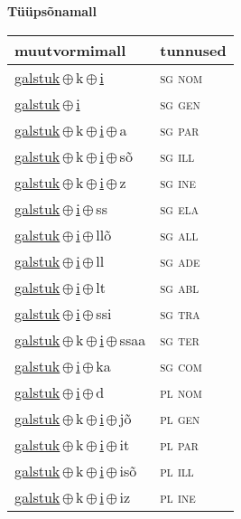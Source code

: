 

\vspace{3.5em}
\noindent \begin{minipage}{\textwidth}
\noindent \textbf{Tüüpsõnamall \,}\\

\begin{sideways}
\begin{tabular}{l l}
muutvormimall & tunnused \\
\hline
\underline{galstuk}\,$\oplus$\,k\,$\oplus$\,\underline{i} & \textsc{ sg nom } \\
\underline{galstuk}\,$\oplus$\,\underline{i} & \textsc{ sg gen } \\
\underline{galstuk}\,$\oplus$\,k\,$\oplus$\,\underline{i}\,$\oplus$\,a & \textsc{ sg par } \\
\underline{galstuk}\,$\oplus$\,k\,$\oplus$\,\underline{i}\,$\oplus$\,sõ & \textsc{ sg ill } \\
\underline{galstuk}\,$\oplus$\,k\,$\oplus$\,\underline{i}\,$\oplus$\,z & \textsc{ sg ine } \\
\underline{galstuk}\,$\oplus$\,\underline{i}\,$\oplus$\,ss & \textsc{ sg ela } \\
\underline{galstuk}\,$\oplus$\,\underline{i}\,$\oplus$\,llõ & \textsc{ sg all } \\
\underline{galstuk}\,$\oplus$\,\underline{i}\,$\oplus$\,ll & \textsc{ sg ade } \\
\underline{galstuk}\,$\oplus$\,\underline{i}\,$\oplus$\,lt & \textsc{ sg abl } \\
\underline{galstuk}\,$\oplus$\,\underline{i}\,$\oplus$\,ssi & \textsc{ sg tra } \\
\underline{galstuk}\,$\oplus$\,k\,$\oplus$\,\underline{i}\,$\oplus$\,ssaa & \textsc{ sg ter } \\
\underline{galstuk}\,$\oplus$\,\underline{i}\,$\oplus$\,ka & \textsc{ sg com } \\
\underline{galstuk}\,$\oplus$\,\underline{i}\,$\oplus$\,d & \textsc{ pl nom } \\
\underline{galstuk}\,$\oplus$\,k\,$\oplus$\,\underline{i}\,$\oplus$\,jõ & \textsc{ pl gen } \\
\underline{galstuk}\,$\oplus$\,k\,$\oplus$\,\underline{i}\,$\oplus$\,it & \textsc{ pl par } \\
\underline{galstuk}\,$\oplus$\,k\,$\oplus$\,\underline{i}\,$\oplus$\,isõ & \textsc{ pl ill } \\
\underline{galstuk}\,$\oplus$\,k\,$\oplus$\,\underline{i}\,$\oplus$\,iz & \textsc{ pl ine } \\

\end{tabular}
\end{sideways}
\end{minipage}
